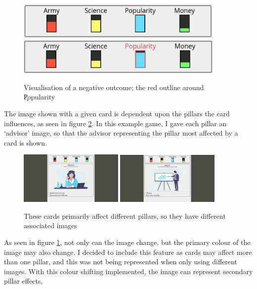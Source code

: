 \begin{figure}[!h]
	\centering
	\includegraphics[width=0.9\textwidth]{./images/design/pillars.png}
	\includegraphics[width=0.9\textwidth]{./images/design/hover.png}
	\caption{Visualisation of a negative outcome; the red outline around \c{Popularity} }
	\label{fig:colour_comp}
\end{figure}

The image shown with a given card is dependent upon the pillars the card influences, as seen in figure \ref{fig:advisor_comp}. In this example game, I gave each pillar an `advisor' image, so that the advisor representing the pillar most affected by a card is shown.

\begin{figure}[!h]
	\centering
	\includegraphics[width=0.45\textwidth]{./images/design/game.png}
	\includegraphics[width=0.45\textwidth]{./images/design/ecman_blue.png}
	\caption{These cards primarily affect different pillars, so they have different associated images}
	\label{fig:advisor_comp}
\end{figure}

As seen in figure \ref{fig:colour_comp}, not only can the image change, but the primary colour of the image may also change. I decided to include this feature as cards may affect more than one pillar, and this was not being represented when only using different images. With this colour shifting implemented, the image can represent secondary pillar effects.

